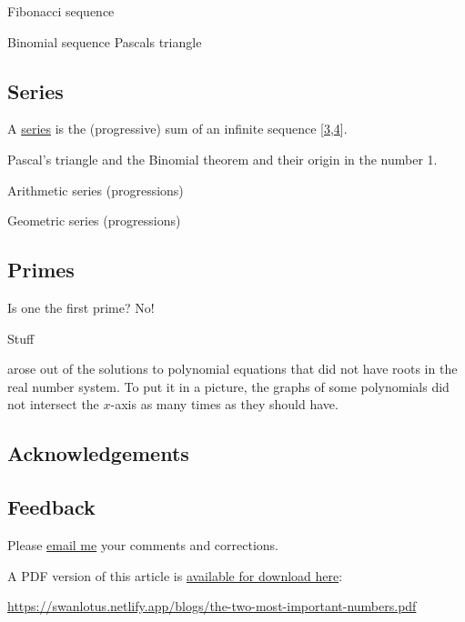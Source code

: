 \documentclass[
  a4paper,
]{article}
\begin{document}
Fibonacci sequence

Binomial sequence Pascals triangle

\hypertarget{series}{%
\subsection{Series}\label{series}}

A \href{https://mathworld.wolfram.com/Series.html}{series} is the
(progressive) sum of an infinite sequence
{[}\protect\hyperlink{ref-wikiseries}{3},\protect\hyperlink{ref-wolframseries}{4}{]}.

Pascal's triangle and the Binomial theorem and their origin in the
number 1.

Arithmetic series (progressions)

Geometric series (progressions)

\hypertarget{primes}{%
\subsection{Primes}\label{primes}}

Is one the first prime? No!

Stuff

arose out of the solutions to polynomial equations that did not have
roots in the real number system. To put it in a picture, the graphs of
some polynomials did not intersect the \(x\)-axis as many times as they
should have.

\hypertarget{acknowledgements}{%
\subsection{Acknowledgements}\label{acknowledgements}}

\hypertarget{feedback}{%
\subsection{Feedback}\label{feedback}}

Please \href{mailto:feedback.swanlotus@gmail.com}{email me} your
comments and corrections.

\noindent A PDF version of this article is
\href{./the-two-most-important-numbers.pdf}{available for download
here}:

\begin{small}

\begin{sffamily}

\url{https://swanlotus.netlify.app/blogs/the-two-most-important-numbers.pdf}

\end{sffamily}

\end{small}
\end{document}
